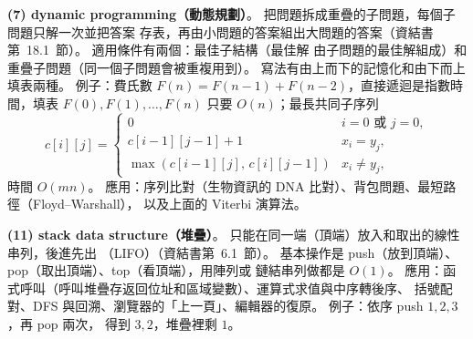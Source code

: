 \begin{pastsoln}
\textbf{(7) dynamic programming（動態規劃）}。 把問題拆成重疊的子問題，每個子問題只解一次並把答案
存表，再由小問題的答案組出大問題的答案（資結書第~18.1~節）。 適用條件有兩個：最佳子結構（最佳解
由子問題的最佳解組成）和重疊子問題（同一個子問題會被重複用到）。 寫法有由上而下的記憶化和由下而上
填表兩種。 例子：費氏數 $F(n) = F(n-1) + F(n-2)$，直接遞迴是指數時間，填表 $F(0), F(1), \ldots,
F(n)$ 只要 $O(n)$；最長共同子序列
\[
c[i][j] = \begin{cases} 0 & i = 0 \text{ 或 } j = 0, \\ c[i-1][j-1] + 1 & x_i = y_j, \\
\max(c[i-1][j],\, c[i][j-1]) & x_i \ne y_j, \end{cases}
\]
時間 $O(mn)$。 應用：序列比對（生物資訊的 DNA 比對）、背包問題、最短路徑（Floyd--Warshall），
以及上面的 Viterbi 演算法。

\textbf{(11) stack data structure（堆疊）}。 只能在同一端（頂端）放入和取出的線性串列，後進先出
（LIFO）（資結書第~6.1~節）。 基本操作是 push（放到頂端）、pop（取出頂端）、top（看頂端），用陣列或
鏈結串列做都是 $O(1)$。 應用：函式呼叫（呼叫堆疊存返回位址和區域變數）、運算式求值與中序轉後序、
括號配對、DFS 與回溯、瀏覽器的「上一頁」、編輯器的復原。 例子：依序 push $1, 2, 3$，再 pop 兩次，
得到 $3, 2$，堆疊裡剩 $1$。
\end{pastsoln}
